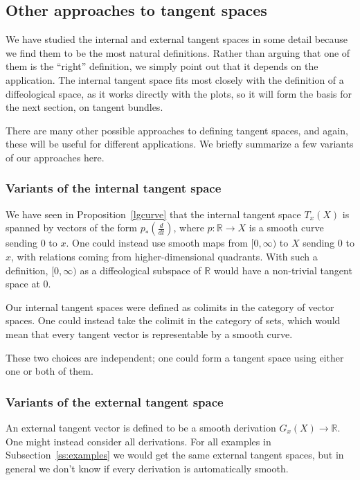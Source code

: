 \documentclass{amsart}
\theoremstyle{remark}
\def \R{\mathbb{R}}
\begin{document}
%

%
%
%
%
%
%
%
%

\subsection{Other approaches to tangent spaces}\label{ss:other-approaches}

We have studied the internal and external tangent spaces in some detail
because we find them to be the most natural definitions.
Rather than arguing that one of them is the ``right'' definition, we
simply point out that it depends on the application.
The internal tangent space fits most closely with the definition of a
diffeological space, as it works directly with the plots, so it will
form the basis for the next section, on tangent bundles.
%
%
%
%
%
%
%
%
%
%
%

There are many other possible approaches to defining tangent spaces,
and again, these will be useful for different applications.
We briefly summarize a few variants of our approaches here.

\subsubsection{Variants of the internal tangent space}

We have seen in Proposition~\ref{lgcurve} that the internal tangent space
$T_x(X)$ is spanned by vectors of the form $p_*(\frac{d}{dt})$,
where $p : \R \to X$ is a smooth curve sending $0$ to $x$.
One could instead use smooth maps from $[0, \infty)$ to $X$ sending
$0$ to $x$, with relations coming from higher-dimensional quadrants.
With such a definition, $[0, \infty)$ as a diffeological subspace of $\R$
would have a non-trivial tangent space at $0$.

Our internal tangent spaces were defined as colimits in the category of vector spaces.
One could instead take the colimit in the category of sets, which would mean
that every tangent vector is representable by a smooth curve.
%
%
%

These two choices are independent;  one could form a tangent space
using either one or both of them.

\subsubsection{Variants of the external tangent space}

An external tangent vector is defined to be a smooth derivation $G_x(X) \to \R$.
One might instead consider all derivations.
For all examples in Subsection~\ref{ss:examples} we would get the same external tangent spaces,
but in general we don't know if every derivation is automatically smooth.
\end{document}
